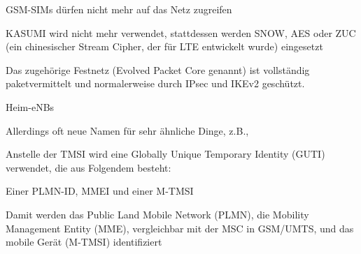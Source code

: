 \documentclass[a4paper]{article}
\begin{document}
\begin{multicols}{3}
\begin{itemize*}
            \begin{itemize*}
                  \item GSM-SIMs dürfen nicht mehr auf das Netz zugreifen
                  \item KASUMI wird nicht mehr verwendet, stattdessen werden SNOW, AES oder ZUC (ein chinesischer Stream Cipher, der für LTE entwickelt wurde) eingesetzt
                  \item Das zugehörige Festnetz (Evolved Packet Core genannt) ist vollständig paketvermittelt und normalerweise durch IPsec und IKEv2 geschützt.
                  \item Heim-eNBs
            \end{itemize*}
            \item
            Allerdings oft neue Namen für sehr ähnliche Dinge, z.B.,

            \begin{itemize*}
                  \item Anstelle der TMSI wird eine Globally Unique Temporary Identity (GUTI) verwendet, die aus Folgendem besteht:
                  \begin{itemize*} \item Einer PLMN-ID, MMEI und einer M-TMSI \item Damit werden das Public Land Mobile Network (PLMN), die Mobility Management Entity (MME), vergleichbar mit der MSC in GSM/UMTS, und das mobile Gerät (M-TMSI) identifiziert \end{itemize*}
            \end{itemize*}
      \end{itemize*}

\end{multicols}
\end{document}
